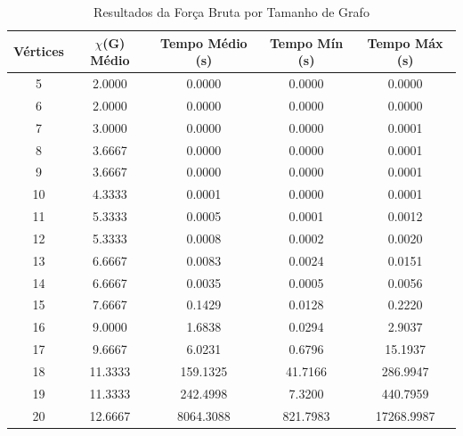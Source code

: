 \begin{table}
\centering
\caption{Resultados da Força Bruta por Tamanho de Grafo}
\label{tab:resultados_forca_bruta_1}
\begin{tabular}{ccccc}
\toprule
Vértices & $\chi$(G) Médio & Tempo Médio (s) & Tempo Mín (s) & Tempo Máx (s) \\
\midrule
5 & 2.0000 & 0.0000 & 0.0000 & 0.0000 \\
6 & 2.0000 & 0.0000 & 0.0000 & 0.0000 \\
7 & 3.0000 & 0.0000 & 0.0000 & 0.0001 \\
8 & 3.6667 & 0.0000 & 0.0000 & 0.0001 \\
9 & 3.6667 & 0.0000 & 0.0000 & 0.0001 \\
10 & 4.3333 & 0.0001 & 0.0000 & 0.0001 \\
11 & 5.3333 & 0.0005 & 0.0001 & 0.0012 \\
12 & 5.3333 & 0.0008 & 0.0002 & 0.0020 \\
13 & 6.6667 & 0.0083 & 0.0024 & 0.0151 \\
14 & 6.6667 & 0.0035 & 0.0005 & 0.0056 \\
15 & 7.6667 & 0.1429 & 0.0128 & 0.2220 \\
16 & 9.0000 & 1.6838 & 0.0294 & 2.9037 \\
17 & 9.6667 & 6.0231 & 0.6796 & 15.1937 \\
18 & 11.3333 & 159.1325 & 41.7166 & 286.9947 \\
19 & 11.3333 & 242.4998 & 7.3200 & 440.7959 \\
20 & 12.6667 & 8064.3088 & 821.7983 & 17268.9987 \\
\bottomrule
\end{tabular}
\end{table}
